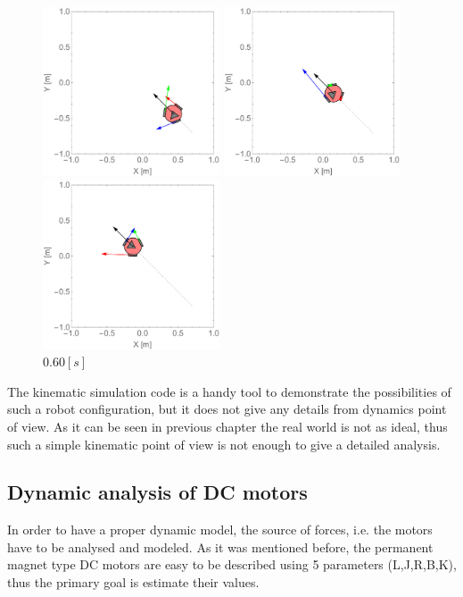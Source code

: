\documentclass[12pt,english]{article}
\begin{document}
\begin{figure}[htb!]
	\centering
	\includegraphics[height=5cm]{figures/2d_simulation/animations/2D_move_along_line_and_rotating/20}
	\caption{$0.20[s]$}
	\endminipage\hfill
	\centering
	\includegraphics[height=5cm]{figures/2d_simulation/animations/2D_move_along_line_and_rotating/40}
	\caption{$0.40[s]$}
	\endminipage\hfill
	\centering
	\includegraphics[height=5cm]{figures/2d_simulation/animations/2D_move_along_line_and_rotating/60}
	\caption{$0.60[s]$}
	\endminipage\hfill
\end{figure}
The kinematic simulation code is a handy tool to demonstrate the possibilities of such a robot configuration, but it does not give any details from dynamics point of view. As it can be seen in previous chapter the real world is not as ideal, thus such a simple kinematic point of view is not enough to give a detailed analysis.
\newpage
\subsection{Dynamic analysis of DC motors}
In order to have a proper dynamic model, the source of forces, i.e. the motors have to be analysed and modeled. As it was mentioned before, the permanent magnet type DC motors are easy to be described using 5 parameters (L,J,R,B,K), thus the primary goal is estimate their values.
\end{document}
